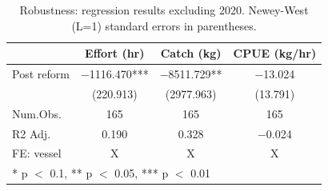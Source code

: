 \begin{table}
\centering
\caption{\label{tab:no2020}Robustness: regression results excluding 2020. Newey-West (L=1) standard errors in parentheses.}
\centering
\begin{tabular}[t]{lccc}
\toprule
  & Effort (hr) & Catch (kg) & CPUE (kg/hr)\\
\midrule
Post reform & \num{-1116.470}*** & \num{-8511.729}** & \num{-13.024}\\
 & (\num{220.913}) & (\num{2977.963}) & (\num{13.791})\\
\midrule
Num.Obs. & \num{165} & \num{165} & \num{165}\\
R2 Adj. & \num{0.190} & \num{0.328} & \num{-0.024}\\
FE: vessel & X & X & X\\
\bottomrule
\multicolumn{4}{l}{\rule{0pt}{1em}* p $<$ 0.1, ** p $<$ 0.05, *** p $<$ 0.01}\\
\end{tabular}
\end{table}
